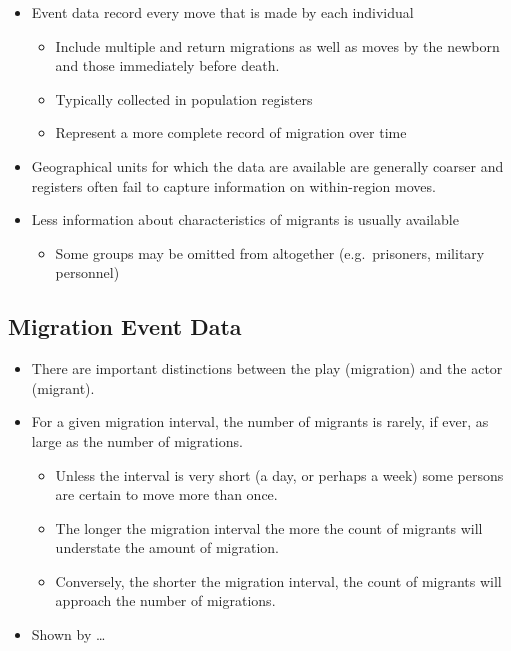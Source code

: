 \documentclass[
]{book}
\providecommand{\tightlist}{%
  \setlength{\itemsep}{0pt}\setlength{\parskip}{0pt}}
\begin{document}
\begin{itemize}
\tightlist
\item
  Event data record every move that is made by each individual

  \begin{itemize}
  \tightlist
  \item
    Include multiple and return migrations as well as moves by the newborn and those immediately before death.
  \item
    Typically collected in population registers
  \item
    Represent a more complete record of migration over time
  \end{itemize}
\item
  Geographical units for which the data are available are generally coarser and registers often fail to capture information on within-region moves.
\item
  Less information about characteristics of migrants is usually available

  \begin{itemize}
  \tightlist
  \item
    Some groups may be omitted from altogether (e.g.~prisoners, military personnel)
  \end{itemize}
\end{itemize}

\hypertarget{migration-event-data-1}{%
\subsection{Migration Event Data}\label{migration-event-data-1}}

\begin{itemize}
\tightlist
\item
  There are important distinctions between the play (migration) and the actor (migrant).
\item
  For a given migration interval, the number of migrants is rarely, if ever, as large as the number of migrations.

  \begin{itemize}
  \tightlist
  \item
    Unless the interval is very short (a day, or perhaps a week) some persons are certain to move more than once.
  \item
    The longer the migration interval the more the count of migrants will understate the amount of migration.
  \item
    Conversely, the shorter the migration interval, the count of migrants will approach the number of migrations.
  \end{itemize}
\item
  Shown by \citet{Courgeau1979} \ldots{}
\end{itemize}
\end{document}
